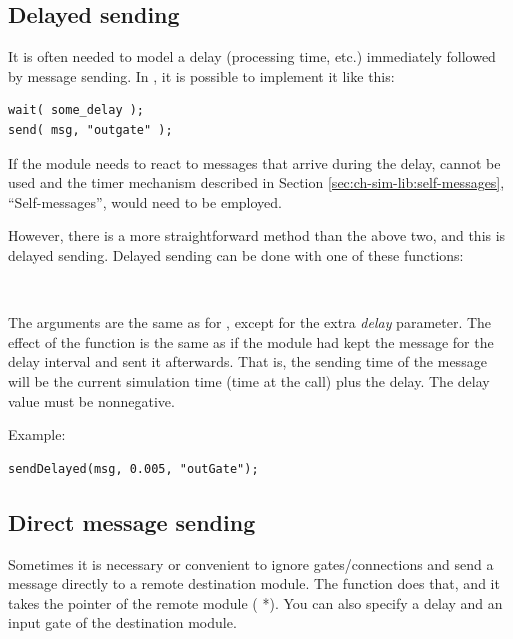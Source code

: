 \subsection{Delayed sending}

It is often needed to model a delay (processing time, etc.) immediately
followed by message sending. In {\opp}, it is possible to implement
it like this:

\begin{verbatim}
wait( some_delay );
send( msg, "outgate" );
\end{verbatim}


If the module needs to react to messages that arrive during the delay,
 cannot be used and the timer mechanism described in
Section \ref{sec:ch-sim-lib:self-messages}, ``Self-messages'', would
need to be employed.


However, there is a more straightforward method than the above two,
and this is delayed sending. Delayed sending
can be done with one of these functions:

\\


The arguments are the same as for , except for the extra \textit{delay}
parameter. The effect of the function is the same as if the module
had kept the message for the delay interval and sent it afterwards.
That is, the sending time of the message will be the current
simulation time (time at the  call) plus the delay.
The delay value must be nonnegative.

Example:

\begin{verbatim}
sendDelayed(msg, 0.005, "outGate");
\end{verbatim}



\subsection{Direct message sending}

Sometimes it is necessary or convenient to ignore gates/connections
and send a message directly to a remote destination module. The 
function does that, and it takes the pointer of the remote module
( *). You can also specify a delay and an input gate of
the destination module.

